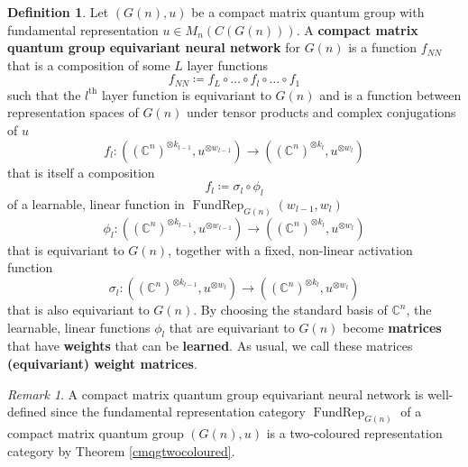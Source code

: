 \documentclass{article}
\DeclareMathOperator{\FundRep}{FundRep}
\theoremstyle{plain}
\theoremstyle{definition}
\newtheorem{definition}[theorem]{Definition}
\theoremstyle{remark}
\newtheorem{remark}[theorem]{Remark}
\begin{document}
\begin{definition} \label{quantumGneuralnetwork}
	Let $(G(n), u)$ be a compact matrix quantum group with fundamental representation $u \in M_n(C(G(n)))$.
	A \textbf{compact matrix quantum group equivariant neural network} for $G(n)$
	is a function $f_{\mathit{NN}}$
	that is a composition of some $L$ layer functions
	\begin{equation}
		f_{\mathit{NN}} \coloneqq f_L \circ \ldots \circ f_{l} \circ \ldots \circ f_1
  	\end{equation}
	such that the $l^{\text{th}}$ layer function is equivariant to $G(n)$
	and is a function between representation spaces of $G(n)$ 
	under tensor products and complex conjugations of $u$
	\begin{equation}
		f_l: 
		((\mathbb{C}^{n})^{\otimes k_{l-1}}, u^{\otimes w_{l-1}})
		\rightarrow 
		((\mathbb{C}^{n})^{\otimes k_{l}}, u^{\otimes w_{l}})
	\end{equation}
	that is itself a composition
  	\begin{equation} \label{quantumGlayerfidefn}
	  	f_l \coloneqq \sigma_l \circ \phi_l
  	\end{equation}
	of a learnable, linear function
	in $\FundRep_{G(n)}(w_{l-1}, w_l)$	
	\begin{equation} \label{quantumGlayerlinear}
		\phi_l : 
		((\mathbb{C}^{n})^{\otimes k_{l-1}}, u^{\otimes w_{l-1}})
		\rightarrow 
		((\mathbb{C}^{n})^{\otimes k_{l}}, u^{\otimes w_{l}})
	\end{equation}
	that is equivariant to $G(n)$,
	together with a fixed, non-linear activation function 
	\begin{equation}	
		\sigma_l: 
		((\mathbb{C}^{n})^{\otimes k_{l-1}}, u^{\otimes w_{l}})
		\rightarrow 
		((\mathbb{C}^{n})^{\otimes k_{l}}, u^{\otimes w_{l}})
	\end{equation}
	that is also equivariant to $G(n)$.
	By choosing the standard basis of $\mathbb{C}^{n}$,
	the learnable, linear functions $\phi_l$ that are equivariant to $G(n)$
	become \textbf{matrices} that have \textbf{weights} that can be \textbf{learned}.
	As usual, we call these matrices \textbf{(equivariant) weight matrices}.
\end{definition}

\begin{remark}
	A compact matrix quantum group equivariant neural network 
	is well-defined since the fundamental representation category $\FundRep_{G(n)}$
	of a compact matrix quantum group $(G(n), u)$
	is a two-coloured representation category by
	Theorem \ref{cmqgtwocoloured}.
\end{remark}
\end{document}
